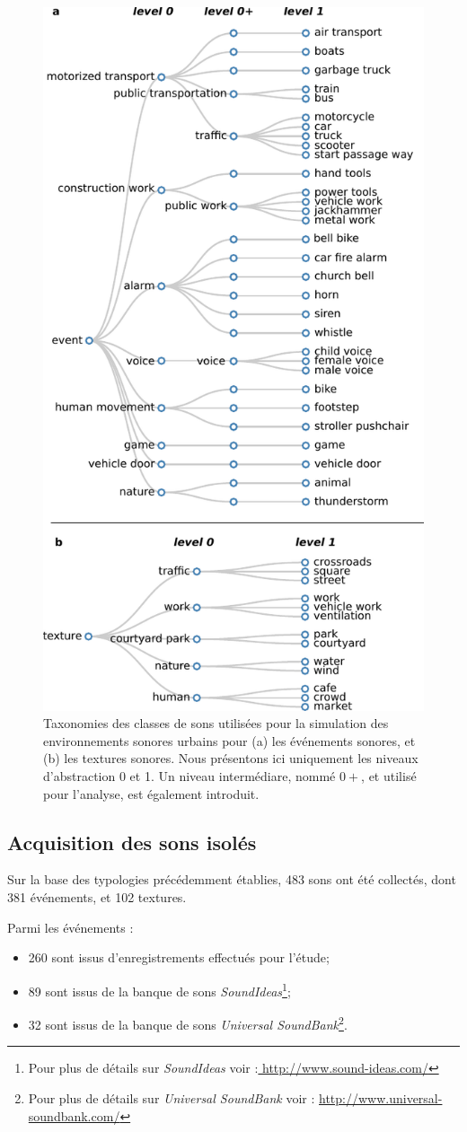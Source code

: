 \begin{figure}[t]
        \myfloatalign
        \includegraphics[width=.5\linewidth]{gfxHierarchy/taxonomy}
       \caption[Taxonomies des classes de sons utilisées pour la simulation des environnements sonores urbains]{Taxonomies des classes de sons utilisées pour la simulation des environnements sonores urbains pour (a) les événements sonores, et (b) les textures sonores. Nous présentons ici uniquement les niveaux d'abstraction 0 et 1. Un niveau intermédiare, nommé $0+$, et utilisé pour l'analyse, est également introduit.}\label{fig:taxonomie}
\end{figure}

\subsection{Acquisition des sons isolés}
\label{sec:ch5_recordDataSet}

Sur la base des typologies précédemment établies, 483 sons ont été collectés, dont 381 événements, et 102 textures.

Parmi les événements :

\begin{itemize}
\item 260 sont issus d’enregistrements effectués pour l'étude;
\item 89 sont issus de la banque de sons \emph{SoundIdeas}\footnote{Pour plus de détails sur \emph{SoundIdeas} voir :\url{ http://www.sound-ideas.com/}};
\item 32 sont issus de la banque de sons \emph{Universal SoundBank}\footnote{Pour plus de détails sur \emph{Universal SoundBank} voir : \url{http://www.universal-soundbank.com/}}.
\end{itemize}

